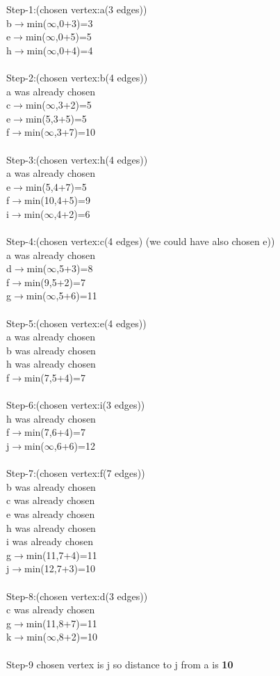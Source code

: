 \documentclass[12pt]{article}
\begin{document}
Step-1:(chosen vertex:a(3 edges))\\
b$\rightarrow$min($\infty$,0+3)=3\\
e$\rightarrow$min($\infty$,0+5)=5\\
h$\rightarrow$min($\infty$,0+4)=4\\
\\
Step-2:(chosen vertex:b(4 edges))\\
a was already chosen\\
c$\rightarrow$min($\infty$,3+2)=5\\
e$\rightarrow$min(5,3+5)=5\\
f$\rightarrow$min($\infty$,3+7)=10\\
\\
Step-3:(chosen vertex:h(4 edges))\\
a was already chosen\\
e$\rightarrow$min(5,4+7)=5\\
f$\rightarrow$min(10,4+5)=9\\
i$\rightarrow$min($\infty$,4+2)=6\\
\\
Step-4:(chosen vertex:c(4 edges) (we could have also chosen e))\\
a was already chosen\\
d$\rightarrow$min($\infty$,5+3)=8\\
f$\rightarrow$min(9,5+2)=7\\
g$\rightarrow$min($\infty$,5+6)=11\\
\\
Step-5:(chosen vertex:e(4 edges))\\
a was already chosen\\
b was already chosen\\
h was already chosen\\
f$\rightarrow$min(7,5+4)=7\\
\\
Step-6:(chosen vertex:i(3 edges))\\
h was already chosen\\
f$\rightarrow$min(7,6+4)=7\\
j$\rightarrow$min($\infty$,6+6)=12\\
\\
Step-7:(chosen vertex:f(7 edges))\\
b was already chosen\\
c was already chosen\\
e was already chosen\\
h was already chosen\\
i was already chosen\\
g$\rightarrow$min(11,7+4)=11\\
j$\rightarrow$min(12,7+3)=10\\
\\
Step-8:(chosen vertex:d(3 edges))\\
c was already chosen\\
g$\rightarrow$min(11,8+7)=11\\
k$\rightarrow$min($\infty$,8+2)=10\\
\\
Step-9 chosen vertex is j so distance to j from a is \textbf{10}\\
\end{document}
